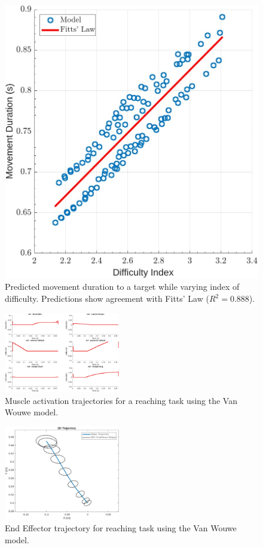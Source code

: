\documentclass[letterpaper, 10pt, conference]{ieeeconf}
\begin{document}
\begin{figure}[h]
    \centering
    \includegraphics[width=0.8\linewidth]{images/final_fitts_law_mpc.jpg}
    \caption{Predicted movement duration to a target while varying index of difficulty. Predictions show agreement with Fitts' Law ($R^2 = 0.888$).}
    \label{fig:FittsLaw}
\end{figure}

\begin{figure}[h]
    \centering
    \includegraphics[width=0.45\textwidth]{images/demo_activations_small.jpg}
    \caption{Muscle activation trajectories for a reaching task using the Van Wouwe model.}
    \label{fig:demo_activations}
\end{figure}

\begin{figure}[h]
    \centering
    \includegraphics[width=0.45\textwidth]{images/demo_traj_small.jpg}
    \caption{End Effector trajectory for reaching task using the Van Wouwe model.}
    \label{fig:demo_position}
\end{figure}
\end{document}
